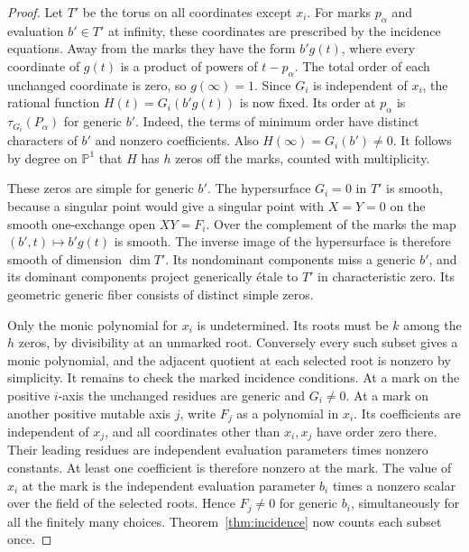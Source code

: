 \documentclass[11pt,reqno]{amsart}
\numberwithin{equation}{section}
\theoremstyle{definition}
\theoremstyle{remark}
\begin{document}
\begin{proof}
Let \(T'\) be the torus on all coordinates except \(x_i\).
For marks \(p_\alpha\) and evaluation \(b'\in T'\) at infinity,
these coordinates are prescribed by the incidence equations. Away
from the marks they have the form \(b'g(t)\), where every
coordinate of \(g(t)\) is a product of powers of \(t-p_\alpha\).
The total order of each unchanged coordinate is zero, so \(g(\infty)=1\).
Since \(G_i\) is independent of \(x_i\), the rational function
\(H(t)=G_i(b'g(t))\) is now fixed. Its order at \(p_\alpha\)
is \(\tau_{G_i}(P_\alpha)\) for generic \(b'\). Indeed, the terms
of minimum order have distinct characters of \(b'\) and nonzero
coefficients. Also \(H(\infty)=G_i(b')\ne0\). It follows by degree
on \(\mathbb P^1\) that \(H\) has \(h\) zeros off the marks,
counted with multiplicity.

These zeros are simple for generic \(b'\). The hypersurface
\(G_i=0\) in \(T'\) is smooth, because a singular point would give
a singular point with \(X=Y=0\) on the smooth one-exchange open
\(XY=F_i\). Over the complement of the marks the map
\((b',t)\mapsto b'g(t)\) is smooth. The inverse image of the
hypersurface is therefore smooth of dimension \(\dim T'\).
Its nondominant components miss a generic \(b'\), and its dominant
components project generically \'{e}tale to \(T'\) in characteristic
zero. Its geometric generic fiber consists of distinct simple zeros.

Only the monic polynomial for \(x_i\) is undetermined. Its roots
must be \(k\) among the \(h\) zeros, by divisibility at an unmarked
root. Conversely every such subset gives a monic polynomial, and
the adjacent quotient at each selected root is nonzero by simplicity.
It remains to check the marked incidence conditions. At a mark on
the positive \(i\)-axis the unchanged residues are generic and
\(G_i\ne0\). At a mark on another positive mutable axis \(j\), write
\(F_j\) as a polynomial in \(x_i\). Its coefficients are independent
of \(x_j\), and all coordinates other than \(x_i,x_j\) have order
zero there. Their leading residues are independent evaluation
parameters times nonzero constants. At least one coefficient is
therefore nonzero at the mark. The value of \(x_i\) at the
mark is the independent evaluation parameter \(b_i\) times a nonzero
scalar over the field of the selected roots. Hence \(F_j\ne0\)
for generic \(b_i\), simultaneously for all the finitely many
choices. Theorem~\ref{thm:incidence} now counts each subset once.
\end{proof}
\end{document}
